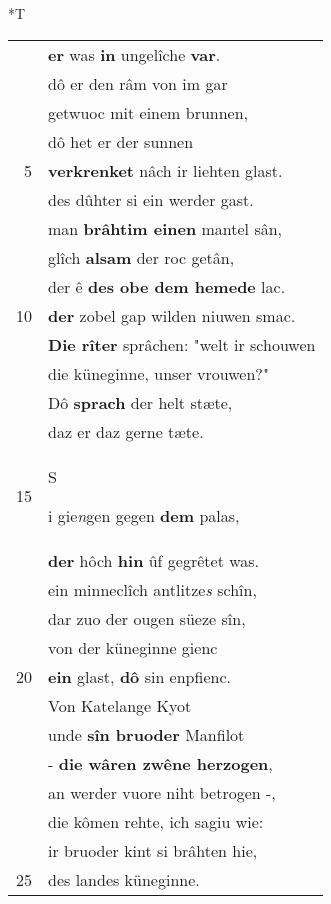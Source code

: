 \documentclass[8pt,a4paper,notitlepage]{article}
\begin{document}
\begin{table}[ht]
\begin{minipage}[t]{0.5\linewidth}
\end{minipage}
\hspace{0.5cm}
\begin{minipage}[t]{0.5\linewidth}
\small
\begin{center}*T
\end{center}
\begin{tabular}{rl}
 & \textbf{er} was \textbf{in} ungelîche \textbf{var}.\\ 
 & dô er den râm von im gar\\ 
 & getwuoc mit einem brunnen,\\ 
 & dô het er der sunnen\\ 
5 & \textbf{verkrenket} nâch ir liehten glast.\\ 
 & des dûhter si ein werder gast.\\ 
 & man \textbf{brâht}\textbf{im einen} mantel sân,\\ 
 & glîch \textbf{alsam} der roc getân,\\ 
 & der ê \textbf{des obe dem hemede} lac.\\ 
10 & \textbf{der} zobel gap wilden niuwen smac.\\ 
 & \textbf{Die rîter} sprâchen: "welt ir schouwen\\ 
 & die küneginne, unser vrouwen?"\\ 
 & Dô \textbf{sprach} der helt stæte,\\ 
 & daz er daz gerne tæte.\\ 
15 & \begin{large}S\end{large}i gie\textit{n}gen gegen \textbf{dem} palas,\\ 
 & \textbf{der} hôch \textbf{hin} ûf gegrêtet was.\\ 
 & ein minneclîch antlitze\textit{s} schîn,\\ 
 & dar zuo der ougen süeze sîn,\\ 
 & von der küneginne gienc\\ 
20 & \textbf{ein} glast, \textbf{dô} sin enpfienc.\\ 
 & Von Katelange Kyot\\ 
 & unde \textbf{sîn bruoder} Manfilot\\ 
 & - \textbf{die wâren zwêne herzogen},\\ 
 & an werder vuore niht betrogen -,\\ 
 & die kômen rehte, ich sagiu wie:\\ 
 & ir bruoder kint si brâhten hie,\\ 
25 & des landes küneginne.\\ 

\end{tabular}
\end{minipage}
\end{table}
\end{document}
